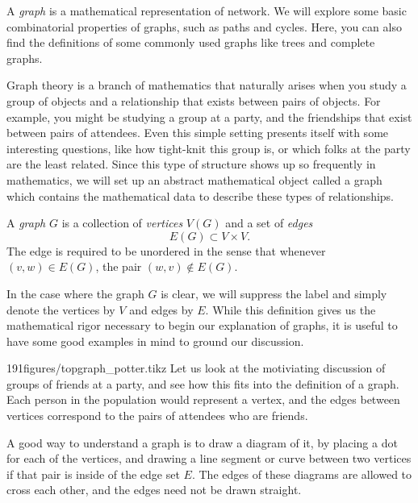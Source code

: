 \begin{elevator}	
A \emph{graph} is a mathematical representation of network. We will explore some basic combinatorial properties of graphs, such as paths and cycles. Here, you can also find the definitions of some commonly used graphs like trees and complete graphs. 
\end{elevator}%
\label{sec:graph:basic}%
Graph theory is a branch of mathematics that naturally arises when you study a group of objects and a relationship that exists between pairs of objects.
For example, you might be studying a group at a party, and the friendships that exist between pairs of attendees.
Even this simple setting presents itself with some interesting questions, like how tight-knit this group is, or which folks at the party are the least related.
Since this type of structure shows up so frequently in mathematics, we will set up an abstract mathematical object called a graph which contains the mathematical data to describe these types of relationships.
\begin{definition}[Graph]
	A \emph{graph} $G$ is a collection of \emph{vertices} $V(G)$ and a set of \emph{edges} 
	\[E(G)\subset V\times V.\]
	The edge is required to be unordered in the sense that  whenever $(v,  w)\in E(G)$,  the pair  $(w,  v)\not\in E(G)$.
\end{definition}
In the case where the graph $G$ is clear, we will suppress the label and simply denote the vertices  by $V$ and edges by $E$.
While this definition gives us the mathematical rigor necessary to begin our explanation of graphs, it is useful to have some good examples in mind to ground our discussion.
\begin{examplefigureenv}{191figures/topgraph_potter.tikz}
Let us look at the motiviating discussion of groups of friends at a party, and see how this fits into the definition of a graph.
Each person in the population would represent a vertex, and the edges between vertices correspond to the pairs of attendees who are friends.
\end{examplefigureenv}

A good way to understand a graph is to draw a diagram of it, by placing a  dot for each of the vertices, and drawing a line segment or curve between two vertices if that pair is inside of the edge set $E$. 
The edges of these diagrams are allowed to cross each other, and the edges need not be drawn straight.

